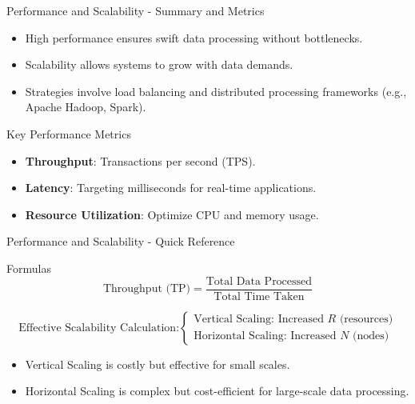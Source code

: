 \documentclass[aspectratio=169]{beamer}
\begin{document}
\begin{frame}[fragile]{Performance and Scalability - Summary and Metrics}
  \begin{itemize}
    \item High performance ensures swift data processing without bottlenecks.
    \item Scalability allows systems to grow with data demands.
    \item Strategies involve load balancing and distributed processing frameworks (e.g., Apache Hadoop, Spark).
  \end{itemize}
  
  \begin{block}{Key Performance Metrics}
    \begin{itemize}
      \item \textbf{Throughput}: Transactions per second (TPS).
      \item \textbf{Latency}: Targeting milliseconds for real-time applications.
      \item \textbf{Resource Utilization}: Optimize CPU and memory usage.
    \end{itemize}
  \end{block}
\end{frame}

\begin{frame}[fragile]{Performance and Scalability - Quick Reference}
  \begin{block}{Formulas}
    \begin{equation}
      \text{Throughput (TP)} = \frac{\text{Total Data Processed}}{\text{Total Time Taken}}
    \end{equation}
    
    \begin{equation}
      \text{Effective Scalability Calculation:}
      \begin{cases}
        \text{Vertical Scaling: Increased } R \text{ (resources)} \\
        \text{Horizontal Scaling: Increased } N \text{ (nodes)}
      \end{cases}
    \end{equation}
  \end{block}
  
  \begin{itemize}
    \item Vertical Scaling is costly but effective for small scales.
    \item Horizontal Scaling is complex but cost-efficient for large-scale data processing.
  \end{itemize}
\end{frame}
\end{document}
